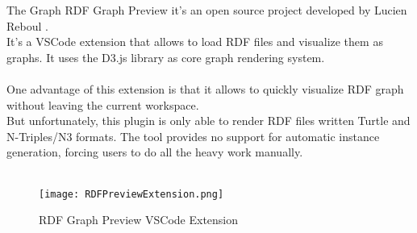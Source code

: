 The Graph RDF Graph Preview it's an open source project developed by Lucien Reboul \cite{rdfpreview2022}.
\\
It's a VSCode extension that allows to load RDF files and visualize them as graphs. It uses the D3.js library as core graph rendering system.
\\
\\
One advantage of this extension is that it allows to quickly visualize RDF graph without leaving the current workspace. 
\\
But unfortunately, this plugin is only able to render RDF files written Turtle and N-Triples/N3 formats. The tool provides no support for automatic instance generation, forcing users to do all the heavy work manually.
\\
\\
\begin{figure}[htb]
    \centering
    \texttt{[image: RDFPreviewExtension.png]}\\
    \caption{RDF Graph Preview VSCode Extension}\label{fig:RDFPreviewExtension}
  \end{figure}
  

